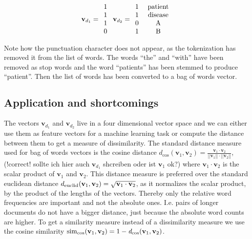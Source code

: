 \[
\textbf{v}_{d_1}=\begin{array}{c}
1\\
1\\
1\\
0
\end{array}\ \textbf{v}_{d_2}=\begin{array}{c}
1\\
1\\
0\\
1
\end{array}\ \begin{array}{c}
\rm{patient}\\
\rm{disease}\\
\rm{A}\\
\rm{B}\\
\end{array}
\]

Note how the punctuation character does not appear, as the tokenization has removed it from the list of words. The words ``the'' and ``with'' have been removed as stop words and the word ``patients'' has been stemmed to produce ``patient''. Then the list of words has been converted to a bag of words vector.

\subsection*{Application and shortcomings}
The vectors $\textbf{v}_{d_1}$ and $\textbf{v}_{d_2}$ live in a four dimensional vector space and we can either use them as feature vectors for a machine learning task or compute the distance between them to get a measure of dissimilarity. The standard distance measure used for bag of words vectors is the cosine distance $d_{\cos}(\textbf{v}_1, \textbf{v}_2)=\frac{\textbf{v}_1\cdot \textbf{v}_2}{||\textbf{v}_1||\cdot ||\textbf{v}_2||}$, (!correct! sollte ich hier auch $\textbf{v}_{d_1}$ shcreiben oder ist $\textbf{v}_1$ ok?) where $\textbf{v}_1\cdot \textbf{v}_2$ is the scalar product of $\textbf{v}_1$ and $\textbf{v}_2$. This distance measure is preferred over the standard euclidean distance $d_{\rm{euclid}}(\textbf{v}_1, \textbf{v}_2)=\sqrt{\textbf{v}_1\cdot \textbf{v}_2}$, as it normalizes the scalar product, by the product of the lengths of the vectors. Thereby only the relative word frequencies are important and not the absolute ones. I.e. pairs of longer documents do not have a bigger distance, just because the absolute word counts are higher. To get a similarity measure instead of a dissimilarity measure we use the cosine similarity $\rm{sim}_{\cos}(\textbf{v}_1, \textbf{v}_2) = 1 - \mathit{d}_{\cos}(\textbf{v}_1, \textbf{v}_2)$.

